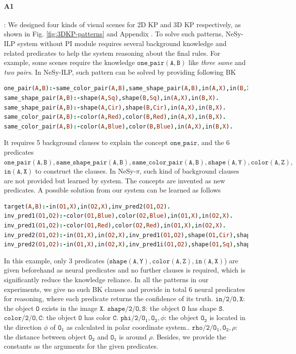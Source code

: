 \documentclass[
]{ceurart}
\begin{document}
	\paragraph{A1}: We designed four kinds of visual scenes for 2D KP and 3D KP respectively, as shown in Fig. \ref{fig:3DKP-patterns} and Appendix . To solve such patterns, NeSy-ILP system without PI module requires several background knowledge and related predicates to help the system reasoning about the final rules. For example, some scenes require the knowledge $ \mathtt{one\_pair(A,B)} $ like \textit{three same} and \textit{two pairs}. In NeSy-ILP, such pattern can be solved by providing following BK
	\begin{lstlisting}[language=Prolog,  style=Prolog-pygsty]
one_pair(A,B):-same_color_pair(A,B),same_shape_pair(A,B),in(A,X),in(B,X).
same_shape_pair(A,B):-shape(A,Sq),shape(B,Sq),in(A,X),in(B,X).
same_shape_pair(A,B):-shape(A,Cir),shape(B,Cir),in(A,X),in(B,X).	
same_color_pair(A,B):-color(A,Red),color(B,Red),in(A,X),in(B,X).
same_color_pair(A,B):-color(A,Blue),color(B,Blue),in(A,X),in(B,X).
	\end{lstlisting}
	It requires 5 background clauses to explain the concept $ \mathtt{one\_pair} $, and the 6 predicates $ \mathtt{one\_pair(A,B), same\_shape\_pair(A,B), same\_color\_pair(A,B), shape(A,Y), color(A,Z) } ,$ $  \mathtt{in(A,X)} $ to construct the clauses.
	In NeSy-$ \pi $, such kind of background clauses are not provided but learned by system. The concepts are invented  as new predicates. A possible solution from our system can be learned as follows
	\begin{lstlisting}[language=Prolog,  style=Prolog-pygsty]
target(A,B):-in(O1,X),in(O2,X),inv_pred2(O1,O2).
inv_pred1(O1,O2):-color(O1,Blue),color(O2,Blue),in(O1,X),in(O2,X).
inv_pred1(O1,O2):-color(O1,Red),color(O2,Red),in(O1,X),in(O2,X).
inv_pred2(O1,O2):-in(O1,X),in(O2,X),inv_pred1(O1,O2),shape(O1,Cir),shape(O2,Cir).
inv_pred2(O1,O2):-in(O1,X),in(O2,X),inv_pred1i(O1,O2),shape(O1,Sq),shape(O2,Sq).
	\end{lstlisting}
	In this example, only 3 predicates ($\mathtt{shape(A,Y), color(A,Z) , in(A,X)} $) are given beforehand as neural predicates and no further clauses is required, which is significantly reduce the knowledge reliance. In all the patterns in our experiments, we give no such BK clauses and provide in total 6 neural predicates for reasoning, where each predicate returns the confidence of its truth. 
	$ \mathtt{in/2/O,X} $: the object $\mathtt{O}$ exists in the image $\mathtt{X}$. 
	$ \mathtt{shape/2/O,S} $: the object $\mathtt{O}$ has shape $\mathtt{S}$. 
	$\mathtt{color/2/O,C}$: the object $\mathtt{O}$ has color $\mathtt{C}$.
	$\mathtt{phi/2/O_1,O_2, \phi}$: the object $\mathtt{O_2}$ is located in the direction $\phi$ of $\mathtt{O_1}$ as calculated in polar coordinate system..
	$\mathtt{rho/2/O_1,O_2, \rho}$: the distance between object $\mathtt{O_2}$ and $\mathtt{O_1}$ is around $\rho$.
	Besides, we provide the constants as the arguments for the given predicates. 
	
\end{document}
